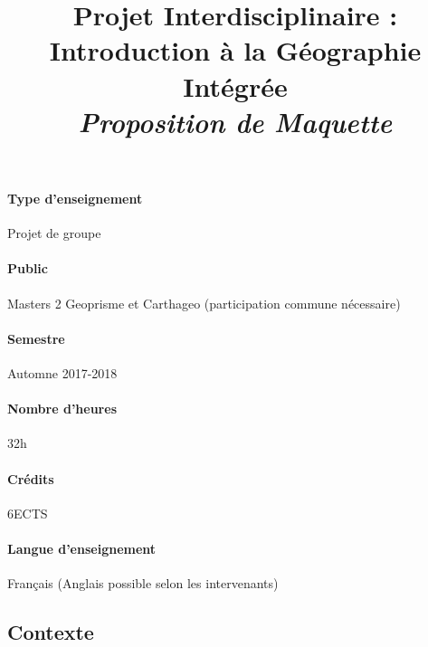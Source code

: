 \documentclass[11pt]{article}
\title{Projet Interdisciplinaire : Introduction à la Géographie Intégrée\\\medskip
\textit{Proposition de Maquette}
}
\author{}
\date{}
\begin{document}
\maketitle

%



\paragraph{Type d'enseignement} 

Projet de groupe

\paragraph{Public}

Masters 2 Geoprisme et Carthageo (participation commune nécessaire)

\paragraph{Semestre}

Automne 2017-2018

\paragraph{Nombre d'heures}

32h

\paragraph{Crédits}

6ECTS

\paragraph{Langue d'enseignement}

Français (Anglais possible selon les intervenants)


\justify

\subsection*{Contexte}
\end{document}
